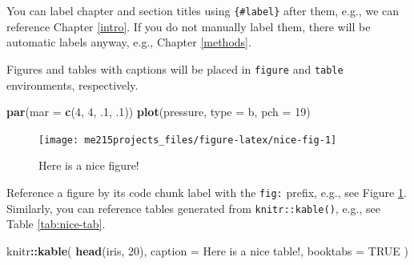 \documentclass[
]{book}
\newenvironment{Shaded}{\begin{snugshade}}{\end{snugshade}}
\newcommand{\DataTypeTok}[1]{\textcolor[rgb]{0.13,0.29,0.53}{#1}}
\newcommand{\DecValTok}[1]{\textcolor[rgb]{0.00,0.00,0.81}{#1}}
\newcommand{\FloatTok}[1]{\textcolor[rgb]{0.00,0.00,0.81}{#1}}
\newcommand{\KeywordTok}[1]{\textcolor[rgb]{0.13,0.29,0.53}{\textbf{#1}}}
\newcommand{\NormalTok}[1]{#1}
\newcommand{\OperatorTok}[1]{\textcolor[rgb]{0.81,0.36,0.00}{\textbf{#1}}}
\newcommand{\OtherTok}[1]{\textcolor[rgb]{0.56,0.35,0.01}{#1}}
\newcommand{\StringTok}[1]{\textcolor[rgb]{0.31,0.60,0.02}{#1}}
\begin{document}
You can label chapter and section titles using \texttt{\{\#label\}} after them, e.g., we can reference Chapter \ref{intro}. If you do not manually label them, there will be automatic labels anyway, e.g., Chapter \ref{methods}.

Figures and tables with captions will be placed in \texttt{figure} and \texttt{table} environments, respectively.

\begin{Shaded}
\begin{Highlighting}[]
\KeywordTok{par}\NormalTok{(}\DataTypeTok{mar =} \KeywordTok{c}\NormalTok{(}\DecValTok{4}\NormalTok{, }\DecValTok{4}\NormalTok{, }\FloatTok{.1}\NormalTok{, }\FloatTok{.1}\NormalTok{))}
\KeywordTok{plot}\NormalTok{(pressure, }\DataTypeTok{type =} \StringTok{\textquotesingle{}b\textquotesingle{}}\NormalTok{, }\DataTypeTok{pch =} \DecValTok{19}\NormalTok{)}
\end{Highlighting}
\end{Shaded}

\begin{figure}

{\centering \texttt{[image: me215projects\_files/figure-latex/nice-fig-1]} 

}

\caption{Here is a nice figure!}\label{fig:nice-fig}
\end{figure}

Reference a figure by its code chunk label with the \texttt{fig:} prefix, e.g., see Figure \ref{fig:nice-fig}. Similarly, you can reference tables generated from \texttt{knitr::kable()}, e.g., see Table \ref{tab:nice-tab}.

\begin{Shaded}
\begin{Highlighting}[]
\NormalTok{knitr}\OperatorTok{::}\KeywordTok{kable}\NormalTok{(}
  \KeywordTok{head}\NormalTok{(iris, }\DecValTok{20}\NormalTok{), }\DataTypeTok{caption =} \StringTok{\textquotesingle{}Here is a nice table!\textquotesingle{}}\NormalTok{,}
  \DataTypeTok{booktabs =} \OtherTok{TRUE}
\NormalTok{)}
\end{Highlighting}
\end{Shaded}
\end{document}
